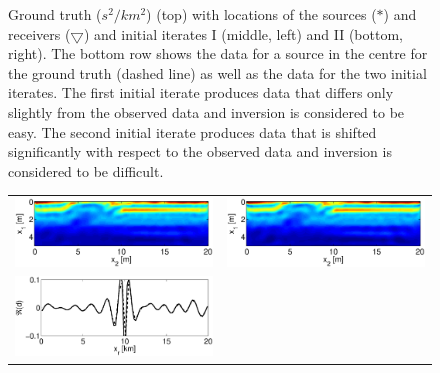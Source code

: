 \documentclass{iopart}
\begin{document}
{\begin{figure}
\begin{tabular}{cc}
\end{tabular}
\caption{Ground truth ($s^2/km^2$) (top) with locations of the sources ($*$) and receivers ($\bigtriangledown$) and initial iterates I (middle, left) and II (bottom, right). The bottom row shows the data for a source in the centre for the ground truth (dashed line) as well as the data for the two initial iterates. The first initial iterate produces data that differs only slightly from the observed data and inversion is considered to be easy. The second initial iterate produces data that is shifted significantly with respect to the observed data and inversion is considered to be difficult.}
\label{fig:overthrust_model}
\end{figure}

\begin{figure}
\centering
\begin{tabular}{cc}
\includegraphics[scale=.3]{./figs/2D_overthrust1_g}&
\includegraphics[scale=.3]{./figs/2D_overthrust1_h}\\
\includegraphics[scale=.3]{./figs/2D_overthrust1_l}&

\end{tabular}
\end{figure}}
\end{document}
